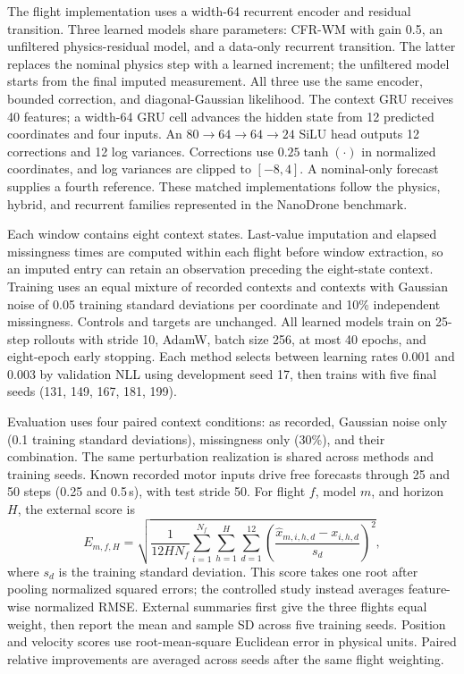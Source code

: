 The flight implementation uses a width-64 recurrent encoder and residual
transition. Three learned models share \ExternalLearnedParameters{} parameters:
CFR-WM with gain 0.5, an unfiltered physics-residual model, and a data-only
recurrent transition. The latter replaces the nominal physics step with a
learned increment; the unfiltered model starts from the final imputed
measurement. All three use the same encoder, bounded correction, and
diagonal-Gaussian likelihood. The context GRU receives 40 features; a
width-64 GRU cell advances the hidden state from 12 predicted coordinates and
four inputs. An $80\!\to\!64\!\to\!64\!\to\!24$ SiLU head outputs
12 corrections and 12 log variances. Corrections use $0.25\tanh(\cdot)$ in
normalized coordinates, and log variances are clipped to $[-8,4]$.
A nominal-only forecast supplies a fourth
reference. These matched implementations follow the physics, hybrid, and
recurrent families represented in the NanoDrone benchmark.

Each window contains eight context states. Last-value imputation and elapsed
missingness times are computed within each flight before window extraction,
so an imputed entry can retain an observation preceding the eight-state
context. Training uses an equal mixture of recorded contexts and contexts
with Gaussian noise of 0.05 training standard deviations per coordinate and
10\% independent missingness. Controls and targets are unchanged. All learned
models train on 25-step rollouts with stride 10, AdamW, batch size 256, at most
40 epochs, and eight-epoch early stopping. Each method selects between
learning rates 0.001 and 0.003 by validation NLL using development seed 17,
then trains with five final seeds (131, 149, 167, 181, 199).

Evaluation uses four paired context conditions: as recorded, Gaussian noise
only (0.1 training standard deviations), missingness only (30\%), and their
combination. The same perturbation realization is shared across methods and
training seeds. Known recorded motor inputs drive free forecasts through
25 and 50 steps (0.25 and 0.5\,s), with test stride 50. For flight $f$, model
$m$, and horizon $H$, the external score is
\begin{equation}
 E_{m,f,H}=\sqrt{\frac{1}{12H N_f}
 \sum_{i=1}^{N_f}\sum_{h=1}^{H}\sum_{d=1}^{12}
 \left(\frac{\widehat{x}_{m,i,h,d}-x_{i,h,d}}{s_d}\right)^2},
 \label{eq:external-score}
\end{equation}
where $s_d$ is the training standard deviation. This score takes one root
after pooling normalized squared errors; the controlled study instead
averages feature-wise normalized RMSE. External summaries first give the
three flights equal weight, then report the mean and sample SD across five
training seeds. Position and velocity scores use root-mean-square Euclidean
error in physical units. Paired relative improvements are averaged across
seeds after the same flight weighting.

